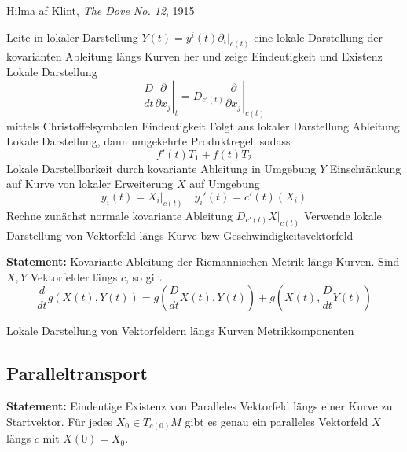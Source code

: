 \documentclass[10pt, letterpaper]{article}
\begin{document}
  {Hilma af Klint, \emph{The Dove No. 12}, 1915}
{%
  \begin{outline}
  Leite in lokaler Darstellung $Y(t)=y^i(t)\partial_i|_{c(t)}$ eine lokale Darstellung der kovarianten Ableitung längs Kurven her und zeige Eindeutigkeit und Existenz
  \1 Lokale Darstellung
  \2 $$\left.\frac{D}{dt}\frac{\partial}{\partial x_j}\right|_{t}
      =\left.D_{c'(t)}\frac{\partial}{\partial x_j}\right|_{c(t)}$$ mittels Christoffelsymbolen
  \1 Eindeutigkeit
  \2 Folgt aus lokaler Darstellung
  \1 Ableitung
  \2 Lokale Darstellung, dann umgekehrte Produktregel, sodass 
  $$f'(t)T_1+f(t)T_2$$
  \1 Lokale Darstellbarkeit durch kovariante Ableitung in Umgebung
  \2 $Y$ Einschränkung auf Kurve von lokaler Erweiterung $X$ auf Umgebung 
  \3 $$y_i(t)=X_i|_{c(t)} \quad y_i'(t)=c'(t)(X_i)$$
  \2 Rechne zunächst normale kovariante Ableitung $D_{c'(t)} X|_{c(t)}$ 
  \2 Verwende lokale Darstellung von Vektorfeld längs Kurve bzw Geschwindigkeitsvektorfeld 
\end{outline}
}





\vspace{0.5cm}

\textbf{Statement: }{Kovariante Ableitung der Riemannischen Metrik längs Kurven}.
Sind $X,Y$ Vektorfelder längs $c$, so gilt
$$
\frac{d}{d t} g(X(t), Y(t))=g\left(\frac{D}{d t} X(t), Y(t)\right)+g\left(X(t), \frac{D}{d t} Y(t)\right)
$$

{%
\begin{outline}
  \1 Lokale Darstellung von Vektorfeldern längs Kurven
  \1 Metrikkomponenten 
\end{outline}
}

\vspace{0.5cm}






\pagebreak



\subsection{Paralleltransport}

\textbf{Statement: }{Eindeutige Existenz von Paralleles Vektorfeld längs einer Kurve zu Startvektor}.
Für jedes $X_{0} \in T_{c(0)} M$ gibt es genau ein paralleles Vektorfeld $X$ längs $c$ mit $X(0)=X_{0}$.
\end{document}
